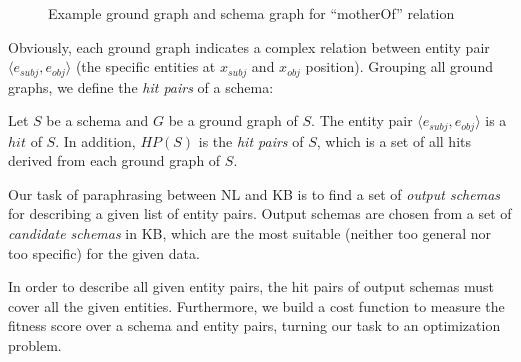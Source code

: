 \begin{figure}[h]
\centering
{}
\caption{Example ground graph and schema graph for ``motherOf'' relation}
\label{fig:schemaExample}
\end{figure}

Obviously, each ground graph indicates a complex relation between entity pair 
$\langle e_{subj}, e_{obj} \rangle$ (the specific entities at $x_{subj}$ and $x_{obj}$ position).
Grouping all ground graphs, we define the \textit{hit pairs} of a schema:

\begin{definition}
Let $S$ be a schema and $G$ be a ground graph of $S$. The entity pair $\langle e_{subj}, e_{obj} \rangle$
is a $hit$ of $S$. In addition, $HP(S)$ is the \textit{hit pairs} of $S$, which is a set of all hits derived from
each ground graph of $S$.
\end{definition}


%

Our task of paraphrasing between NL and KB is to find a set of \textit{output schemas} for
describing a given list of entity pairs.
Output schemas are chosen from a set of \textit{candidate schemas} in KB,
which are the most suitable (neither too general nor too specific) for the given data.

In order to describe all given entity pairs, the hit pairs of output schemas
must cover all the given entities.
Furthermore, we build a cost function to measure the fitness score over a schema and entity pairs,
turning our task to an optimization problem.

